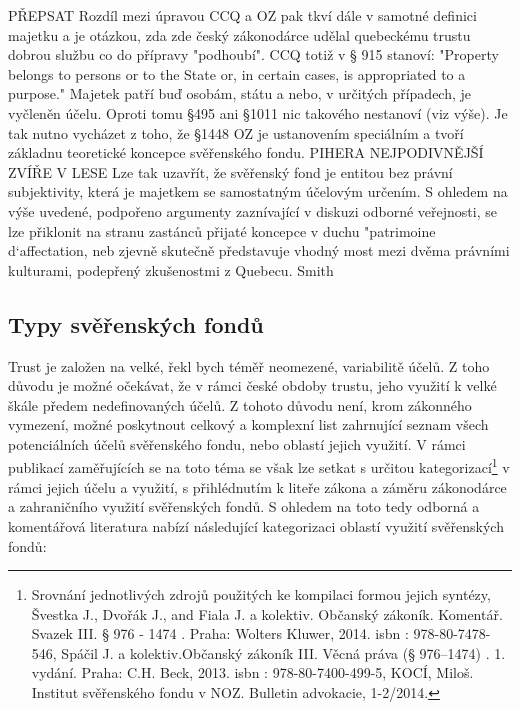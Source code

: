 \documentclass{article}
\begin{document}
PŘEPSAT
Rozdíl mezi úpravou CCQ a OZ pak tkví dále v samotné definici majetku a je otázkou, zda zde český zákonodárce udělal quebeckému trustu dobrou službu co do přípravy "podhoubí". CCQ totiž v § 915 stanoví: "Property belongs to persons or to the State or, in certain cases, is appropriated to a purpose." Majetek patří buď osobám, státu a nebo, v určitých případech, je vyčleněn účelu. Oproti tomu §495 ani §1011 nic takového nestanoví (viz výše). Je tak nutno vycházet z toho, že §1448 OZ je ustanovením speciálním a tvoří základnu teoretické koncepce svěřenského fondu. PIHERA NEJPODIVNĚJŠÍ ZVÍŘE V LESE Lze tak uzavřít, že svěřenský fond je entitou bez právní subjektivity, která je majetkem se samostatným účelovým určením. S ohledem na výše uvedené, podpořeno argumenty zaznívající v diskuzi odborné veřejnosti, se lze přiklonit na stranu zastánců přijaté koncepce v duchu "patrimoine d`affectation, neb zjevně skutečně představuje vhodný most mezi dvěma právními kulturami, podepřený zkušenostmi z Quebecu. Smith\\

\newpage
\thispagestyle{smallertextinheader}
\subsection{Typy svěřenských fondů}




Trust je založen na velké, řekl bych téměř neomezené, variabilitě účelů. Z toho důvodu je možné očekávat, že v rámci české obdoby trustu, jeho využití k velké škále předem nedefinovaných účelů. Z tohoto důvodu není, krom zákonného vymezení, možné poskytnout celkový a komplexní list zahrnující seznam všech potenciálních účelů svěřenského fondu, nebo oblastí jejich využití. V rámci publikací zaměřujících se na toto téma se však lze setkat s určitou kategorizací\footnote{Srovnání jednotlivých zdrojů použitých ke kompilaci formou jejich syntézy, Švestka J., Dvořák J., and Fiala J. a kolektiv. Občanský zákoník. Komentář. Svazek III. § 976 - 1474 . Praha: Wolters Kluwer, 2014. isbn : 978-80-7478-546, Spáčil J. a kolektiv.Občanský zákoník III. Věcná práva (§ 976–1474) . 1. vydání. Praha: C.H. Beck, 2013. isbn : 978-80-7400-499-5, KOCÍ, Miloš. Institut svěřenského fondu v NOZ. Bulletin advokacie, 1-2/2014.} v rámci jejich účelu a využití, s přihlédnutím k liteře zákona a záměru zákonodárce a zahraničního využití svěřenských fondů. S ohledem na toto tedy odborná a komentářová literatura nabízí následující kategorizaci oblastí využití svěřenských fondů:
\end{document}
